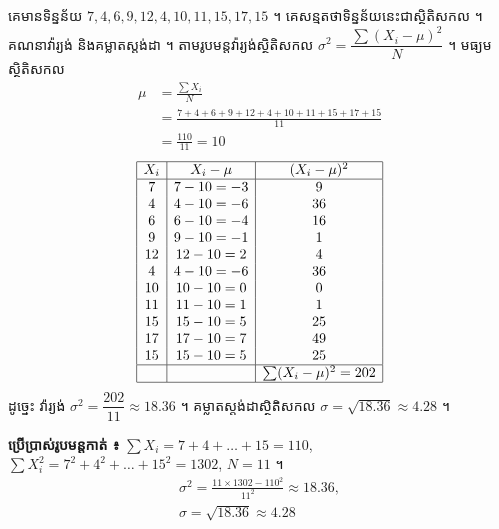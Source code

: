 \begin{example}[លំហាត់គំរូ ១]
គេមានទិន្នន័យ $7, 4, 6, 9, 12, 4, 10, 11, 15, 17, 15$ ។ គេសន្មតថាទិន្នន័យនេះជាស្ថិតិសកល ។ គណនាវ៉ារ្យង់ និងគម្លាតស្តង់ដា ។
\ans
តាមរូបមន្តវ៉ារ្យង់ស្ថិតិសកល $\sigma^2 = \dfrac{\sum(X_i - \mu)^2}{N}$ ។ មធ្យមស្ថិតិសកល
\[
\begin{aligned}
\mu &= \frac{\sum X_i}{N}\\
&= \frac{7 + 4 + 6 + 9 + 12 + 4 + 10 + 11 + 15 + 17 + 15}{11}\\
&= \frac{110}{11} = 10
\end{aligned}
\]
\[
\begin{array}{|c|c|c|}\hline
X_i & X_i - \mu & (X_i - \mu)^2\\ \hline
7 & 7 - 10 = -3 & 9\\
4 & 4 - 10 = -6 & 36\\
6 & 6 - 10 = -4 & 16\\
9 & 9 - 10 = -1 & 1\\
12 & 12 - 10 = 2 & 4\\
4 & 4 - 10 = -6 & 36\\
10 & 10 - 10 = 0 & 0\\
11 & 11 - 10 = 1 & 1\\
15 & 15 - 10 = 5 & 25\\
17 & 17 - 10 = 7 & 49\\
15 & 15 - 10 = 5 & 25\\ \hline
 & & \sum(X_i - \mu)^2 = 202\\ \hline
\end{array}
\]
ដូច្នេះ វ៉ារ្យង់ $\sigma^2 = \dfrac{202}{11} \approx 18.36$ ។ គម្លាតស្តង់ដាស្ថិតិសកល $\sigma = \sqrt{18.36} \approx 4.28$ ។

\textbf{ប្រើប្រាស់រូបមន្តកាត់ ៖} $\sum X_i = 7 + 4 + \dots + 15 = 110$, $\sum X_i^2 = 7^2 + 4^2 + \dots + 15^2 = 1302$, $N = 11$ ។
\[
\begin{gathered}
\sigma^2 = \frac{11\times 1302 - 110^2}{11^2} \approx 18.36,\\
\sigma = \sqrt{18.36} \approx 4.28
\end{gathered}
\]
\end{example}

